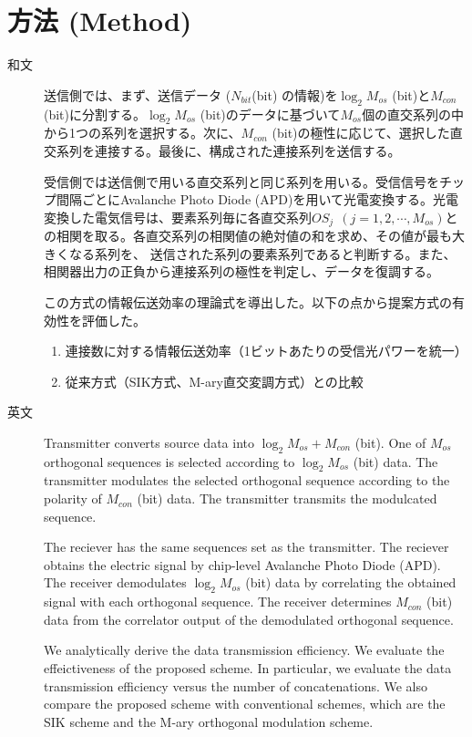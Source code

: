 ﻿\documentclass[a4j,10pt]{jarticle}
\begin{document}
\section{方法 (Method)}
\begin{description}
 \item[和文] 送信側では、まず、送信データ ($N_{bit}$(bit) の情報)を$\log_2 M_{os}$ (bit)と$M_{con}$ (bit)に分割する。$\log_2 M_{os}$ (bit)のデータに基づいて$M_{os}$個の直交系列の中から1つの系列を選択する。次に、$M_{con}$ (bit)の極性に応じて、選択した直交系列を連接する。最後に、構成された連接系列を送信する。

受信側では送信側で用いる直交系列と同じ系列を用いる。受信信号をチップ間隔ごとにAvalanche Photo Diode (APD)を用いて光電変換する。光電変換した電気信号は、要素系列毎に各直交系列$OS_{j}~~(j=1,2, \cdots, M_{os})$との相関を取る。各直交系列の相関値の絶対値の和を求め、その値が最も大きくなる系列を、
送信された系列の要素系列であると判断する。また、相関器出力の正負から連接系列の極性を判定し、データを復調する。

この方式の情報伝送効率の理論式を導出した。以下の点から提案方式の有効性を評価した。
\begin{enumerate}
 \item 連接数に対する情報伝送効率（1ビットあたりの受信光パワーを統一）
 \item 従来方式（SIK方式、M-ary直交変調方式）との比較
\end{enumerate}
%
 \item[英文] Transmitter converts source data into $\log_2 M_{os} + M_{con}$ (bit). One of $M_{os}$ orthogonal sequences is selected according to $\log_2 M_{os}$ (bit) data. The transmitter modulates the selected orthogonal sequence according to the polarity of $M_{con}$ (bit) data. The transmitter transmits the modulcated sequence. 

The reciever has the same sequences set as the transmitter. The reciever obtains the electric signal by chip-level Avalanche Photo Diode (APD). The receiver demodulates $\log_2 M_{os}$ (bit) data by correlating the obtained signal with each orthogonal sequence. The receiver determines $M_{con}$ (bit) data from the correlator output of the demodulated orthogonal sequence. 

We analytically derive the data transmission efficiency. We evaluate the effeictiveness of the proposed scheme. In particular, we evaluate the data transmission efficiency versus the number of concatenations. We also compare the proposed scheme with conventional schemes, which are the SIK scheme and the M-ary orthogonal modulation scheme.
\end{description}
%
%
\end{document}

